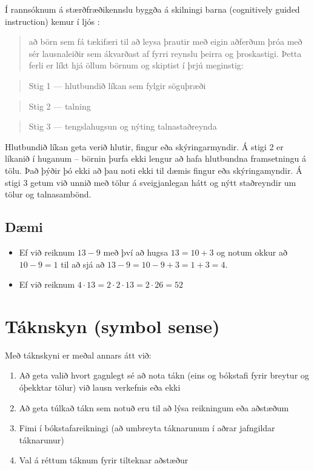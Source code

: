 \documentclass[
  icelandic,
]{book}
\providecommand{\tightlist}{%
  \setlength{\itemsep}{0pt}\setlength{\parskip}{0pt}}
\begin{document}
Í rannsóknum á stærðfræðikennslu byggða á skilningi barna (cognitively guided instruction) kemur í ljós \autocite{kristinsdottir2021}:

\begin{quote}
að börn sem fá tækifæri til að leysa þrautir með eigin aðferðum þróa með sér lausnaleiðir sem ákvarðast af fyrri reynslu þeirra og þroskastigi. Þetta ferli er líkt hjá öllum börnum og skiptist í þrjú meginstig:
\end{quote}

\begin{quote}
Stig 1 --- hlutbundið líkan sem fylgir söguþræði
\end{quote}

\begin{quote}
Stig 2 --- talning
\end{quote}

\begin{quote}
Stig 3 --- tengslahugsun og nýting talnastaðreynda
\end{quote}

Hlutbundið líkan geta verið hlutir, fingur eða skýringarmyndir. Á stigi 2 er líkanið í huganum -- börnin þurfa ekki lengur að hafa hlutbundna framsetningu á tölu. Það þýðir þó ekki að þau noti ekki til dæmis fingur eða skýringamyndir. Á stigi 3 getum við unnið með tölur á sveigjanlegan hátt og nýtt staðreyndir um tölur og talnasambönd.

\subsection{Dæmi}\label{daemi-talnaskyn}

\begin{itemize}
\tightlist
\item
  Ef við reiknum \(13-9\) með því að hugsa \(13 = 10 + 3\) og notum okkur að \(10-9=1\) til að sjá að \(13-9 = 10 - 9 + 3 = 1 + 3 = 4\).
\item
  Ef við reiknum \(4 \cdot 13 = 2 \cdot 2 \cdot 13 = 2 \cdot 26 = 52\)
\end{itemize}

\section{Táknskyn (symbol sense)}\label{taknskyn}

Með táknskyni er meðal annars átt við:

\begin{enumerate}
\def\labelenumi{\alph{enumi}.}
\tightlist
\item
  Að geta valið hvort gagnlegt sé að nota tákn (eins og bókstafi fyrir breytur og óþekktar tölur) við lausn verkefnis eða ekki
\item
  Að geta túlkað tákn sem notuð eru til að lýsa reikningum eða aðstæðum
\item
  Fimi í bókstafareikningi (að umbreyta táknarunum í aðrar jafngildar táknarunur)
\item
  Val á réttum táknum fyrir tilteknar aðstæður
\end{enumerate}
\end{document}

